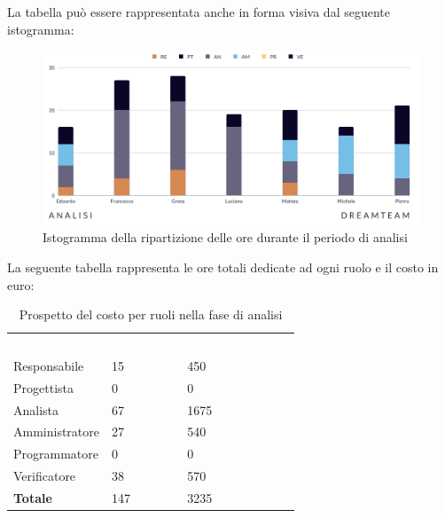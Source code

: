 La tabella può essere rappresentata anche in forma visiva dal seguente istogramma: 
\begin{figure}[!h]
\centering
\includegraphics[scale=0.65]{Sezioni/SezioniPreventivo/grafici/Analisi.png}
\caption{Istogramma della ripartizione delle ore durante il periodo di analisi}
\end{figure}

La seguente tabella rappresenta le ore totali dedicate ad ogni ruolo e il costo in euro:

\begin{table}[!htbp]
\begin{center}
\renewcommand{\arraystretch}{1.5}
\begin{tabular}{ m{}<{\centering}  m{}<{\centering} m{}<{\centering}}
	\rowcolor{darkblue}
	\textcolor{white}{\textbf{Ruolo}}&\textcolor{white}{\textbf{Totale ore}}&\textcolor{white}{\textbf{Costo totale (\euro)}}\\ 

	Responsabile  & 15 &  450\\	
	
	Progettista & 0 &  0 \\
	
	Analista & 67 &  1675\\

	Amministratore & 27 &  540\\
	
	Programmatore & 0 &  0\\
	
	Verificatore & 38 &  570\\
	
	\textbf{Totale} & 147 &  3235 \\
	
\end{tabular}
\caption{Prospetto del costo per ruoli nella fase di analisi}
\end{center}
\end{table}

